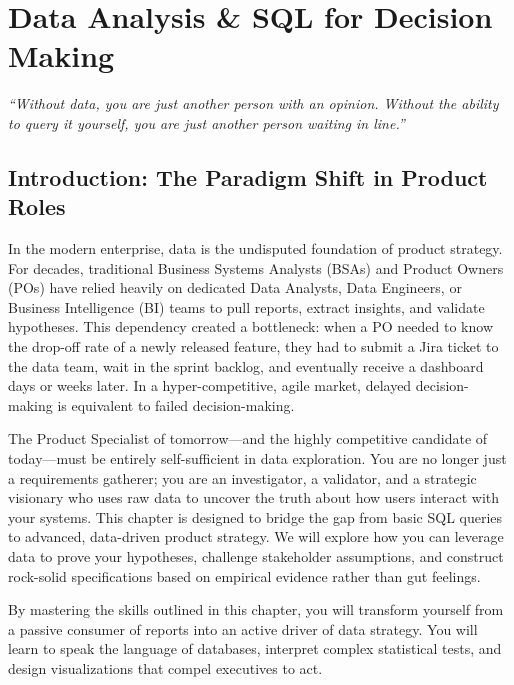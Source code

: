 \documentclass[
  11pt,
  openany,
  oneside]{book}
\renewenvironment{quote}{\begin{customquote}}{\end{customquote}}
\begin{document}
\chapter{Data Analysis \& SQL for Decision
Making}\label{data-analysis-sql-for-decision-making}

\begin{quote}
\emph{``Without data, you are just another person with an opinion.
Without the ability to query it yourself, you are just another person
waiting in line.''}
\end{quote}

\section{Introduction: The Paradigm Shift in Product
Roles}\label{introduction-the-paradigm-shift-in-product-roles}

In the modern enterprise, data is the undisputed foundation of product
strategy. For decades, traditional Business Systems Analysts (BSAs) and
Product Owners (POs) have relied heavily on dedicated Data Analysts,
Data Engineers, or Business Intelligence (BI) teams to pull reports,
extract insights, and validate hypotheses. This dependency created a
bottleneck: when a PO needed to know the drop-off rate of a newly
released feature, they had to submit a Jira ticket to the data team,
wait in the sprint backlog, and eventually receive a dashboard days or
weeks later. In a hyper-competitive, agile market, delayed
decision-making is equivalent to failed decision-making.

The Product Specialist of tomorrow---and the highly competitive
candidate of today---must be entirely self-sufficient in data
exploration. You are no longer just a requirements gatherer; you are an
investigator, a validator, and a strategic visionary who uses raw data
to uncover the truth about how users interact with your systems. This
chapter is designed to bridge the gap from basic SQL queries to
advanced, data-driven product strategy. We will explore how you can
leverage data to prove your hypotheses, challenge stakeholder
assumptions, and construct rock-solid specifications based on empirical
evidence rather than gut feelings.

By mastering the skills outlined in this chapter, you will transform
yourself from a passive consumer of reports into an active driver of
data strategy. You will learn to speak the language of databases,
interpret complex statistical tests, and design visualizations that
compel executives to act.
\end{document}
